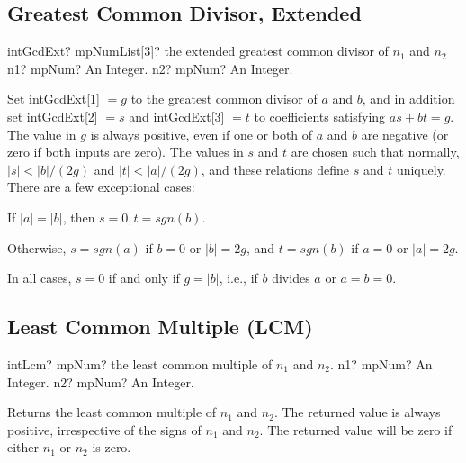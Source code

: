 \subsection{Greatest Common Divisor, Extended}

\begin{mpFunctionsExtract}
	\mpFunctionTwo
	{intGcdExt? mpNumList[3]? the extended greatest common divisor of $n_1$ and $n_2$}
	{n1? mpNum? An Integer.}
	{n2? mpNum? An Integer.}
\end{mpFunctionsExtract}


\vspace{0.3cm}
Set \textsf{intGcdExt}[1] $=g$ to the greatest common divisor of $a$ and $b$, and in addition set \textsf{intGcdExt}[2] $=s$ and \textsf{intGcdExt}[3] $=t$ to coefficients satisfying $as + bt = g$. The value in $g$ is always positive, even if one or both of $a$ and $b$ are negative (or zero if both inputs are zero). The values in $s$ and $t$ are chosen such that normally, $|s| < |b|/(2g)$ and $|t| < |a|/(2g)$, and these relations define $s$ and $t$ uniquely. There are a few exceptional cases:

\vspace{0.3cm}
If $|a| = |b|$, then $s = 0, t = sgn(b)$.

\vspace{0.3cm}
Otherwise, $s = sgn(a)$ if $b = 0$ or $|b| = 2g$, and $t = sgn(b)$ if $a = 0$ or $|a| = 2g$.

\vspace{0.3cm}
In all cases, $s = 0$ if and only if $g = |b|$, i.e., if $b$ divides $a$ or $a = b = 0$.




\subsection{Least Common Multiple (LCM)}

\begin{mpFunctionsExtract}
	\mpFunctionTwo
	{intLcm? mpNum? the least common multiple of $n_1$ and $n_2$.}
	{n1? mpNum? An Integer.}
	{n2? mpNum? An Integer.}
\end{mpFunctionsExtract}


\vspace{0.3cm}
Returns the least common multiple of $n_1$ and $n_2$. The returned value is always positive, irrespective of the signs of $n_1$ and $n_2$. The returned value  will be zero if either $n_1$ or $n_2$ is zero.





